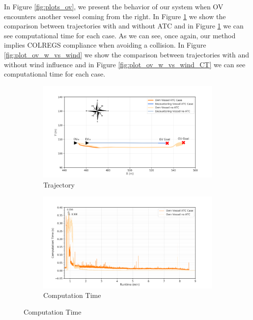         In Figure \ref{fig:plots_ov}, we present the behavior of our system when \ac{OV} encounters another vessel coming from the right. In Figure \ref{fig:plot_ov_w_vs_wo} we show the comparison between trajectories with and without ATC and in Figure \ref{fig:plot_ov_w_vs_wo} we can see computational time for each case. As we can see, once again, our method implies COLREGS compliance when avoiding a collision. In Figure \ref{fig:plot_ov_w_vs_wind} we show the comparison between trajectories with and without wind influence and in Figure \ref{fig:plot_ov_w_vs_wind_CT} we can see computational time for each case. 
        \begin{figure}[H]
        \centering
        
            \begin{subfigure}[b]{0.49\textwidth}
                \centering
                \includegraphics[width=\textwidth]{figs/Chap5/plot_ov_w_vs_wo.png}
                \caption{Trajectory}
                \label{fig:plot_ov_w_vs_wo}
            \end{subfigure}
            \begin{subfigure}[b]{0.49\textwidth}
                \centering
                \includegraphics[width=\textwidth]{figs/Chap5/plot_ov_w_vs_wo_CT.png}
                \caption{Computation Time}
                \label{fig:plot_ov_w_vs_wo_CT}
            \end{subfigure}
            

\end{figure}
